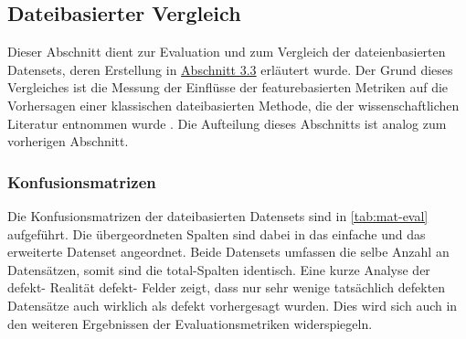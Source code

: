 \subsection{Dateibasierter Vergleich}
\label{classic-eval}

Dieser Abschnitt dient zur Evaluation und zum Vergleich der dateienbasierten Datensets, deren Erstellung in \hyperref[new-datasets]{Abschnitt 3.3} erläutert wurde. Der Grund dieses Vergleiches ist die Messung der Einflüsse der featurebasierten Metriken auf die Vorhersagen einer klassischen dateibasierten Methode, die der wissenschaftlichen Literatur entnommen wurde \cite{Moser2008}. Die Aufteilung dieses Abschnitts ist analog zum vorherigen Abschnitt.

\subsubsection*{Konfusionsmatrizen}

Die Konfusionsmatrizen der dateibasierten Datensets sind in \autoref{tab:mat-eval} aufgeführt. Die übergeordneten Spalten sind dabei in das \glqq einfache\grqq{} und das erweiterte Datenset angeordnet. Beide Datensets umfassen die selbe Anzahl an Datensätzen, somit sind die \glqq total\grqq -Spalten identisch.
Eine kurze Analyse der \glqq defekt\grqq - \glqq Realität defekt\grqq - Felder zeigt, dass nur sehr wenige tatsächlich defekten Datensätze auch wirklich als defekt vorhergesagt wurden. Dies wird sich auch in den weiteren Ergebnissen der Evaluationsmetriken widerspiegeln.

